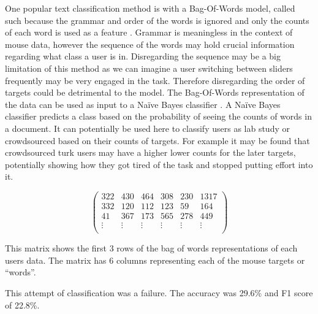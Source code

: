 \documentclass{article}
\begin{document}
One popular text classification method is with a Bag-Of-Words model, called such because the grammar and order of the words is ignored and only the counts of each word is used as a feature \cite{jurafsky2015text}.
Grammar is meaningless in the context of mouse data, however the sequence of the words may hold crucial information regarding what class a user is in.
Disregarding the sequence may be a big limitation of this method as we can imagine a user switching between sliders frequently may be very engaged in the task.
Therefore disregarding the order of targets could be detrimental to the model.
The Bag-Of-Words representation of the data can be used as input to a Naïve Bayes classifier \cite{jurafsky2015text}.
A Naïve Bayes classifier predicts a class based on the probability of seeing the counts of words in a document.  
It can potentially be used here to classify users as lab study or crowdsourced based on their counts of targets.
For example it may be found that crowdsourced turk users may have a higher lower counts for the later targets, potentially showing how they got tired of the task and stopped putting effort into it.

\[    %
\begin{pmatrix}
    322 & 430 & 464 & 308 & 230 & 1317 \\
    332 & 120 & 112 & 123 & 59 & 164 \\
    41 & 367 & 173 & 565 & 278 & 449 \\
    \vdots & \vdots & \vdots & \vdots & \vdots & \vdots \\
\end{pmatrix}
\]    %

\bigskip %
This matrix shows the first 3 rows of the bag of words representations of each users data.
The matrix has 6 columns representing each of the mouse targets or ``words''.


This attempt of classification was a failure.
The accuracy was 29.6\% and F1 score of 22.8\%.


\end{document}

